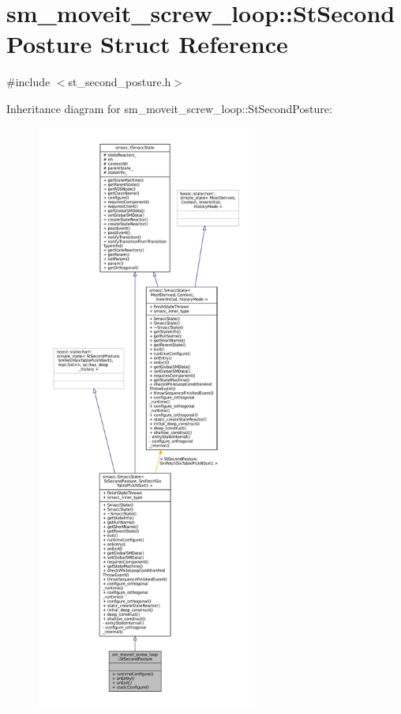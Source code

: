 \hypertarget{structsm__moveit__screw__loop_1_1StSecondPosture}{}\section{sm\+\_\+moveit\+\_\+screw\+\_\+loop\+:\+:St\+Second\+Posture Struct Reference}
\label{structsm__moveit__screw__loop_1_1StSecondPosture}


{\ttfamily \#include $<$st\+\_\+second\+\_\+posture.\+h$>$}



Inheritance diagram for sm\+\_\+moveit\+\_\+screw\+\_\+loop\+:\+:St\+Second\+Posture\+:
\nopagebreak
\begin{figure}[H]
\begin{center}
\leavevmode
\includegraphics[height=550pt]{structsm__moveit__screw__loop_1_1StSecondPosture__inherit__graph}
\end{center}
\end{figure}


